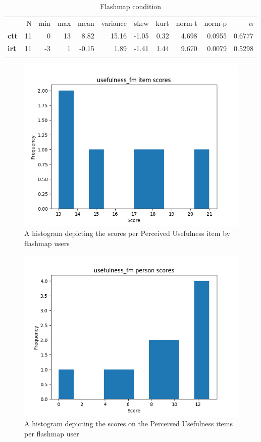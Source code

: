 \begin{longtable}[c]{@{}lrrrrrrrrrr@{}}
\caption{Flashmap condition}
\endfirsthead
\toprule\addlinespace
& N & min & max & mean & variance & skew & kurt & norm-t &
norm-p & $\alpha$
\\\addlinespace
\midrule
\textbf{ctt} & 11 & 0 & 13 & 8.82 & 15.16 & -1.05 & 0.32 & 4.698 &
0.0955 & 0.6777
\\\addlinespace
\textbf{irt} & 11 & -3 & 1 & -0.15 & 1.89 & -1.41 & 1.44 & 9.670 &
0.0079 & 0.5298
\\\addlinespace
\bottomrule
    \label{tab:usefulness_fm}
\end{longtable}

\begin{figure}
    \centering
    \includegraphics[width=.7\textwidth]{img/usefulness_fm_diff.png}
    \caption{A histogram depicting the scores per Perceived Usefulness item by flashmap users}
    \label{fig:usefulness_fm_diff}
\end{figure}
\begin{figure}
    \centering
    \includegraphics[width=.7\textwidth]{img/usefulness_fm_abil.png}
    \caption{A histogram depicting the scores on the Perceived Usefulness items per flashmap user}
    \label{fig:usefulness_fm_abil}
\end{figure}

